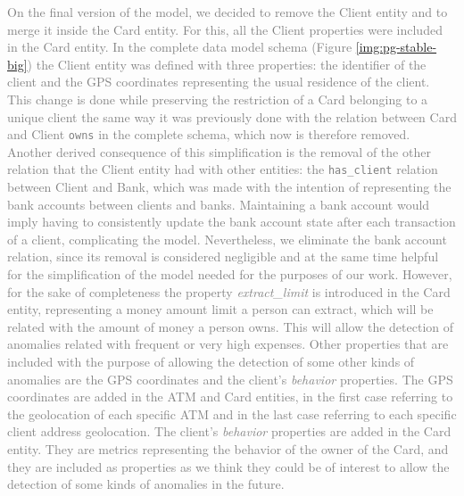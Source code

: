 \textcolor{gray}{
On the final version of the model, we decided to remove the Client entity and to merge it inside the Card entity. For this, all the Client properties were included in the Card entity. In the complete data model schema (Figure \ref{img:pg-stable-big}) the Client entity was defined with three properties: the identifier of the client and the GPS coordinates representing the usual residence of the client. This change is done while preserving the restriction of a Card belonging to a unique client the same way it was previously done with the relation between Card and Client \texttt{owns} in the complete schema, which now is therefore removed.} \\
\textcolor{gray}{
Another derived consequence of this simplification is the removal of the other relation that the Client entity had with other entities: the \texttt{has\_client} relation between Client and Bank, which was made with the intention of representing the bank accounts between clients and banks. Maintaining a bank account would imply having to consistently update the bank account state after each transaction of a client, complicating the model. Nevertheless, we eliminate the bank account relation, since its removal is considered negligible and at the same time helpful for the simplification of the model needed for the purposes of our work. %
However, for the sake of completeness the property \textit{extract\_limit} is introduced in the Card entity, representing a money amount limit a person can extract, which will be related with the amount of money a person owns. This will allow the detection of anomalies related with frequent or very high expenses. Other properties that are included with the purpose of allowing the detection of some other kinds of anomalies are the GPS coordinates and the client's \emph{behavior} properties. The GPS coordinates are added in the ATM and Card entities, in the first case referring to the geolocation of each specific ATM and in the last case referring to each specific client address geolocation. The client's \emph{behavior} properties are added in the Card entity. They are metrics representing the behavior of the owner of the Card, and they are included as properties as we think they could be of interest to allow the detection of some kinds of anomalies in the future.}


